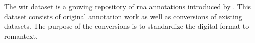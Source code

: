 

The \gls{wir} dataset is a growing repository of \gls{rna}
annotations
introduced by \textcite{gotham2019romantext,
gotham2022openscore}. This dataset consists of original
annotation work as well as conversions of existing datasets.
The purpose of the conversions is to standardize the digital
format to \gls{romantext}.